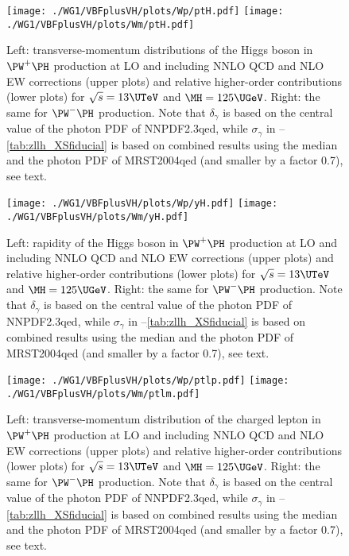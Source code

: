 \begin{figure}
\texttt{[image: ./WG1/VBFplusVH/plots/Wp/ptH.pdf]}
\hfill
\texttt{[image: ./WG1/VBFplusVH/plots/Wm/ptH.pdf]}
\caption{Left: transverse-momentum distributions of the Higgs boson in $\PW^+\PH$
production at LO and including NNLO QCD and NLO EW corrections (upper plots)
and relative higher-order contributions (lower plots) for $\sqrt{s}=13\UTeV$ and $\MH=125\UGeV$.
Right: the same for $\PW^-\PH$ production.
Note that $\delta_\gamma$ is based on the central value
of the photon PDF of NNPDF2.3qed, while $\sigma_\gamma$ in --\ref{tab:zllh_XSfiducial}
is based on combined results using the median and the photon PDF of MRST2004qed (and smaller by a factor 0.7), see text. 
}
\label{fig:SM-WH-ptH}
\end{figure}
%
\begin{figure}
\texttt{[image: ./WG1/VBFplusVH/plots/Wp/yH.pdf]}
\hfill
\texttt{[image: ./WG1/VBFplusVH/plots/Wm/yH.pdf]}
\caption{Left: rapidity of the Higgs boson in $\PW^+\PH$
production at LO and including NNLO QCD and NLO EW corrections (upper plots)
and relative higher-order contributions (lower plots) for $\sqrt{s}=13\UTeV$ and $\MH=125\UGeV$.
Right: the same for $\PW^-\PH$ production.
Note that $\delta_\gamma$ is based on the central value
of the photon PDF of NNPDF2.3qed, while $\sigma_\gamma$ in --\ref{tab:zllh_XSfiducial}
is based on combined results using the median and the photon PDF of MRST2004qed (and smaller by a factor 0.7), see text. 
}
\label{fig:SM-WH-yH}
\end{figure}
%
\begin{figure}
\texttt{[image: ./WG1/VBFplusVH/plots/Wp/ptlp.pdf]}
\hfill
\texttt{[image: ./WG1/VBFplusVH/plots/Wm/ptlm.pdf]}
\caption{Left: transverse-momentum distribution of the charged lepton in $\PW^+\PH$
production at LO and including NNLO QCD and NLO EW corrections (upper plots)
and relative higher-order contributions (lower plots) for $\sqrt{s}=13\UTeV$ and $\MH=125\UGeV$.
Right: the same for $\PW^-\PH$ production.
Note that $\delta_\gamma$ is based on the central value
of the photon PDF of NNPDF2.3qed, while $\sigma_\gamma$ in --\ref{tab:zllh_XSfiducial}
is based on combined results using the median and the photon PDF of MRST2004qed (and smaller by a factor 0.7), see text. 
}
\label{fig:SM-WH-ptlep}
\end{figure}
%
